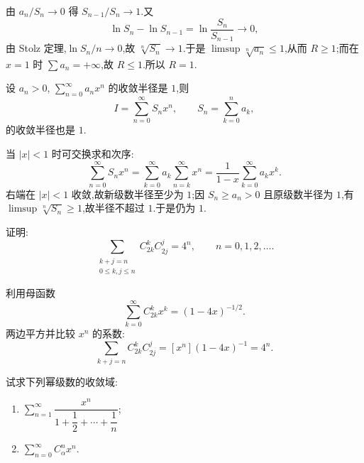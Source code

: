 \begin{solution}
    由 $a_n/S_n\to0$ 得 $S_{n-1}/S_n\to1$.又
    \[
        \ln S_n-\ln S_{n-1}=\ln\dfrac{S_n}{S_{n-1}}\to0,
    \]
    由 Stolz 定理,$\ln S_n/n\to0$,故 $\sqrt[n]{S_n}\to1$.于是
    $\limsup\sqrt[n]{a_n}\leq1$,从而 $R\geq1$;而在 $x=1$ 时
    $\sum a_n=+\infty$,故 $R\leq1$.所以 $R=1$.
\end{solution}

\begin{example}
    设 $a_n>0$, $\displaystyle\sum\limits_{n=0}^{\infty}a_nx^n$ 的收敛半径是 $1$,则
    \[
        I=\sum\limits_{n=0}^{\infty}S_nx^n,
        \qquad
        S_n=\sum\limits_{k=0}^{n}a_k,
    \]
    的收敛半径也是 $1$.
\end{example}
\exampleblank

\begin{solution}
    当 $|x|<1$ 时可交换求和次序:
    \[
        \sum\limits_{n=0}^{\infty}S_nx^n
        =\sum\limits_{k=0}^{\infty}a_k\sum\limits_{n=k}^{\infty}x^n
        =\dfrac{1}{1-x}\sum\limits_{k=0}^{\infty}a_kx^k.
    \]
    右端在 $|x|<1$ 收敛,故新级数半径至少为 $1$;因 $S_n\geq a_n>0$ 且原级数半径为 $1$,有
    $\limsup\sqrt[n]{S_n}\geq1$,故半径不超过 $1$.于是仍为 $1$.
\end{solution}

\begin{example}
    证明:
    \[
        \sum\limits_{\substack{k+j=n\\0\leq k,j\leq n}}C_{2k}^{k}C_{2j}^{j}=4^n,
        \qquad n=0,1,2,\ldots.
    \]
\end{example}
\exampleblank

\begin{solution}
    利用母函数
    \[
        \sum\limits_{k=0}^{\infty}C_{2k}^{k}x^k=(1-4x)^{-1/2}.
    \]
    两边平方并比较 $x^n$ 的系数:
    \[
        \sum\limits_{k+j=n}C_{2k}^{k}C_{2j}^{j}
            =[x^n](1-4x)^{-1}=4^n.
    \]
\end{solution}

\begin{example}
    试求下列幂级数的收敛域:
    \begin{enumerate}
        \item $\displaystyle\sum\limits_{n=1}^{\infty}\dfrac{x^n}{1+\dfrac{1}{2}+\cdots+\dfrac{1}{n}}$;
        \item $\displaystyle\sum\limits_{n=0}^{\infty}C_{\alpha}^{n}x^n$.
    \end{enumerate}
\end{example}
\exampleblank

